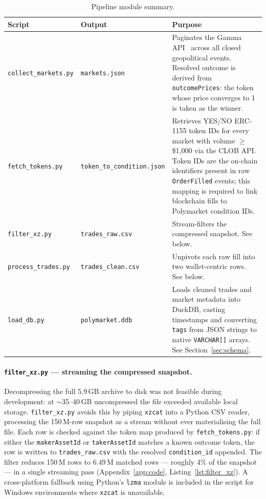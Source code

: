 \begin{table}[H]
\centering
\caption{Pipeline module summary.}
\label{tab:modules}
\small
\begin{tabularx}{\textwidth}{p{4.0cm} p{3.6cm} X}
\toprule
\textbf{Script} & \textbf{Output} & \textbf{Purpose} \\
\midrule
\texttt{collect\_markets.py}
    & \texttt{markets.json}
    & Paginates the Gamma API~\cite{polymarket_docs} across all
      closed geopolitical events.
      Resolved outcome is derived from \texttt{outcomePrices}:
      the token whose price converges to 1 is taken as the winner. \\
\addlinespace[3pt]
\texttt{fetch\_tokens.py}
    & \texttt{token\_to\_condition.json}
    & Retrieves YES/NO ERC-1155 token IDs for every market with
      volume $\geq$\$1{,}000 via the CLOB API.
      Token IDs are the on-chain identifiers present in raw
      \texttt{OrderFilled} events; this mapping is required to
      link blockchain fills to Polymarket condition IDs. \\
\addlinespace[3pt]
\texttt{filter\_xz.py}
    & \texttt{trades\_raw.csv}
    & Stream-filters the compressed snapshot.
      See below. \\
\addlinespace[3pt]
\texttt{process\_trades.py}
    & \texttt{trades\_clean.csv}
    & Unpivots each raw fill into two wallet-centric rows.
      See below. \\
\addlinespace[3pt]
\texttt{load\_db.py}
    & \texttt{polymarket.ddb}
    & Loads cleaned trades and market metadata into DuckDB,
      casting timestamps and converting \texttt{tags} from
      JSON strings to native \texttt{VARCHAR[]} arrays.
      See Section~\ref{sec:schema}. \\
\bottomrule
\end{tabularx}
\end{table}

\paragraph{\texttt{filter\_xz.py} — streaming the compressed snapshot.}
Decompressing the full 5.9\,GB archive to disk was not feasible during
development: at $\sim$35--40\,GB uncompressed the file exceeded
available local storage.
\texttt{filter\_xz.py} avoids this by piping \texttt{xzcat} into a
Python CSV reader, processing the 150\,M-row snapshot as a stream
without ever materialising the full file.
Each row is checked against the token map produced by
\texttt{fetch\_tokens.py}: if either the \texttt{makerAssetId} or
\texttt{takerAssetId} matches a known outcome token, the row is written
to \texttt{trades\_raw.csv} with the resolved \texttt{condition\_id}
appended.
The filter reduces 150\,M rows to 6.49\,M matched rows — roughly 4\%
of the snapshot — in a single streaming pass
(Appendix~\ref{app:code}, Listing~\ref{lst:filter_xz}).
A cross-platform fallback using Python's \texttt{lzma} module is
included in the script for Windows environments where \texttt{xzcat}
is unavailable.

